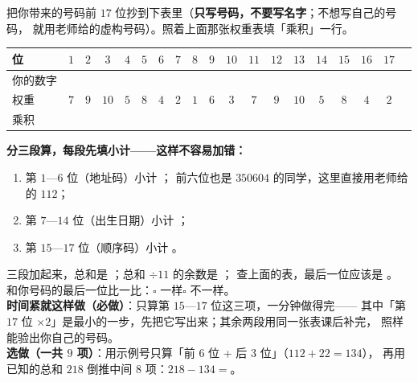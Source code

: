 \begin{dongshou}[用你自己的号码验一遍]
  把你带来的号码前 \(17\) 位抄到下表里（\textbf{只写号码，不要写名字}；不想写自己的号码，
  就用老师给的虚构号码）。照着上面那张权重表填「乘积」一行。

  \begin{center}
  {\small
  \begin{tabular}{@{}lc*{17}{c}@{}}
    \toprule
    位 & \(1\) & \(2\) & \(3\) & \(4\) & \(5\) & \(6\) & \(7\) & \(8\) & \(9\) & \(10\) & \(11\) & \(12\) & \(13\) & \(14\) & \(15\) & \(16\) & \(17\) \\
    \midrule
    你的数字 & & & & & & & & & & & & & & & & & \\
    权重 & \(7\) & \(9\) & \(10\) & \(5\) & \(8\) & \(4\) & \(2\) & \(1\) & \(6\) & \(3\) & \(7\) & \(9\) & \(10\) & \(5\) & \(8\) & \(4\) & \(2\) \\
    乘积 & & & & & & & & & & & & & & & & & \\
    \bottomrule
  \end{tabular}}
  \end{center}

  \textbf{分三段算，每段先填小计——这样不容易加错：}
  \begin{enumerate}
    \item 第 \(1\)—\(6\) 位（地址码）小计 \underline{\hspace{2.4em}}；
      前六位也是 \(350604\) 的同学，这里直接用老师给的 \(112\)；
    \item 第 \(7\)—\(14\) 位（出生日期）小计 \underline{\hspace{2.4em}}；
    \item 第 \(15\)—\(17\) 位（顺序码）小计 \underline{\hspace{2.4em}}。
  \end{enumerate}
  三段加起来，总和是 \underline{\hspace{2.6em}}；总和 \(\div11\) 的余数是 \underline{\hspace{1.4em}}；
  查上面的表，最后一位应该是 \underline{\hspace{1.4em}}。\\
  和你号码的最后一位比一比：\quad \(\square\) 一样\qquad \(\square\) 不一样。\\[3pt]
  {\small\textbf{时间紧就这样做（必做）}：只算第 \(15\)—\(17\) 位这三项，一分钟做得完——
  其中「第 \(17\) 位 \(\times2\)」是最小的一步，先把它写出来；其余两段用同一张表课后补完，
  照样能验出你自己的号码。\\
  \textbf{选做（一共 \(9\) 项）}：用示例号只算「前 \(6\) 位 + 后 \(3\) 位」（\(112+22=134\)），
  再用已知的总和 \(218\) 倒推中间 \(8\) 项：\(218-134=\)\underline{\hspace{1.6em}}。}
\end{dongshou}

